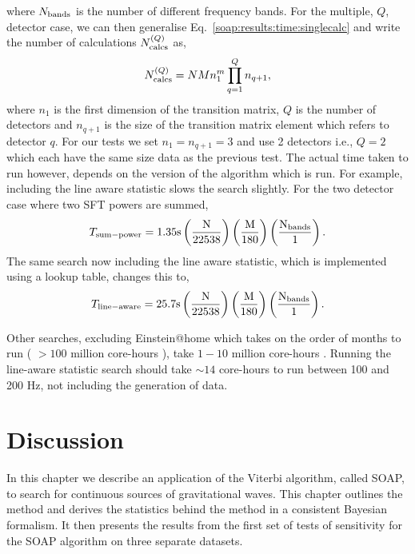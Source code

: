 where  $N_{\rm{bands}}$ is the number of different frequency
bands.
For the multiple, $Q$, detector case, we can then generalise Eq.~\ref{soap:results:time:singlecalc} and write the number of calculations $N^{(Q)}_{\rm{calcs}}$ as,
\begin{equation}
\label{soap:results:time:numbercalcs}
N^{(Q)}_{\rm{calcs}} = NMn_{1}^{m} \prod_{q=1}^{Q}n_{q+1},
\end{equation}
where $n_1$ is the first dimension of the transition matrix, $Q$ is the number of detectors and $n_{q+1}$ is the size of the transition matrix element which refers to detector $q$.
For our tests we set $n_1=n_{q+1}=3$ and use 2 detectors i.e., $Q=2$ which each have the same size data as the previous test. The actual time taken to run however, depends on the version of the algorithm which is run. For example, including the line aware statistic slows the search slightly.
For the two detector case where two \gls{SFT} powers are summed,
\begin{equation}
T_{\rm{sum-power}} = 1.35 \rm{s}\left( \frac{N}{22538}\right) \left( \frac{M}{180}\right) \left( \frac{N_{\rm{bands}}}{1}\right).
\end{equation}
The same search now including the line aware statistic, which is implemented using a lookup table, changes this to,
\begin{equation}
T_{\rm{line-aware}} = 25.7 \rm{s}\left( \frac{N}{22538}\right) \left( \frac{M}{180}\right) \left( \frac{N_{\rm{bands}}}{1}\right).
\end{equation}

Other searches, excluding Einstein@home which takes on the order of months to
run ( $>100$ million core-hours \citep{walsh2016ComparisonMethods}), take
$1-10$ million core-hours \citep{walsh2016ComparisonMethods}.
Running the line-aware statistic search should take $\sim 14$ core-hours to run between 100 and 200 Hz, not including the generation of data.
 
\section{\label{soap:dicussion}Discussion}

In this chapter we describe an application of the Viterbi algorithm, called SOAP,
to search for continuous sources of gravitational waves.  This chapter outlines
the method and derives the statistics behind the method in a consistent
Bayesian formalism. It then presents the results from the first set of tests of
sensitivity for the SOAP algorithm on three separate datasets.

